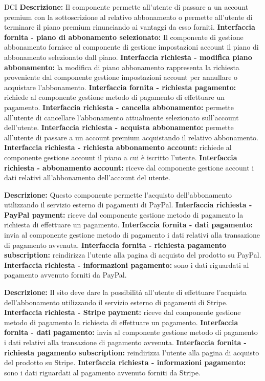\begin{listaPersonale}{DCI}
    \textbf{Descrizione:} Il componente permette all'utente di passare a un account premium con la sottoscrizione al relativo abbonamento o permette all'utente di terminare il piano premium rinunciando ai vantaggi da esso forniti.
    \textbf{Interfaccia fornita - piano di abbonamento selezionato:} Il componente di gestione abbonamento fornisce al componente di gestione impostazioni account il piano di abbonamento selezionato dall piano.
    \textbf{Interfaccia richiesta - modifica piano abbonamento:} la modifica di piano abbonamento rappresenta la richiesta proveniente dal componente gestione impostazioni account per annullare o acquistare l'abbonamento.
    \textbf{Interfaccia fornita - richiesta pagamento:} richiede al componente gestione metodo di pagamento di effettuare un pagamento.
    \textbf{Interfaccia richiesta - cancella abbonamento:} permette all'utente di cancellare l'abbonamento attualmente selezionato sull'account dell'utente.
    \textbf{Interfaccia richiesta - acquista abbonamento:} permette all'utente di passare a un account premium acquistando il relativo abbonamento.
    \textbf{Interfaccia richiesta - richiesta abbonamento account:} richiede al componente gestione account il piano a cui è iscritto l'utente.
    \textbf{Interfaccia richiesta - abbonamento account:} riceve dal componente gestione account i dati relativi all'abbonamento dell'account del utente.


    \textbf{Descrizione:} Questo componente permette l'acquisto dell'abbonamento utilizzando il servizio esterno di pagamenti di PayPal.
    \textbf{Interfaccia richiesta - PayPal payment:} riceve dal componente gestione metodo di pagamento la richiesta di effettuare un pagamento.
    \textbf{Interfaccia fornita - dati pagamento:} invia al componente gestione metodo di pagamento i dati relativi alla transazione di pagamento avvenuta.
    \textbf{Interfaccia fornita - richiesta pagamento subscription:} reindirizza l'utente alla pagina di acquisto del prodotto su PayPal.
    \textbf{Interfaccia richiesta - informazioni pagamento:} sono i dati riguardati al pagamento avvenuto forniti da PayPal.


    \textbf{Descrizione:} Il sito deve dare la possibilità all'utente di effettuare l'acquista dell'abbonamento utilizzando il servizio esterno di pagamenti di Stripe.
    \textbf{Interfaccia richiesta - Stripe payment:} riceve dal componente gestione metodo di pagamento la richiesta di effettuare un pagamento.
    \textbf{Interfaccia fornita - dati pagamento:} invia al componente gestione metodo di pagamento i dati relativi alla transazione di pagamento avvenuta.
    \textbf{Interfaccia fornita - richiesta pagamento subscription:} reindirizza l'utente alla pagina di acquisto del prodotto su Stripe.
    \textbf{Interfaccia richiesta - informazioni pagamento:} sono i dati riguardati al pagamento avvenuto forniti da Stripe.



\end{listaPersonale}

